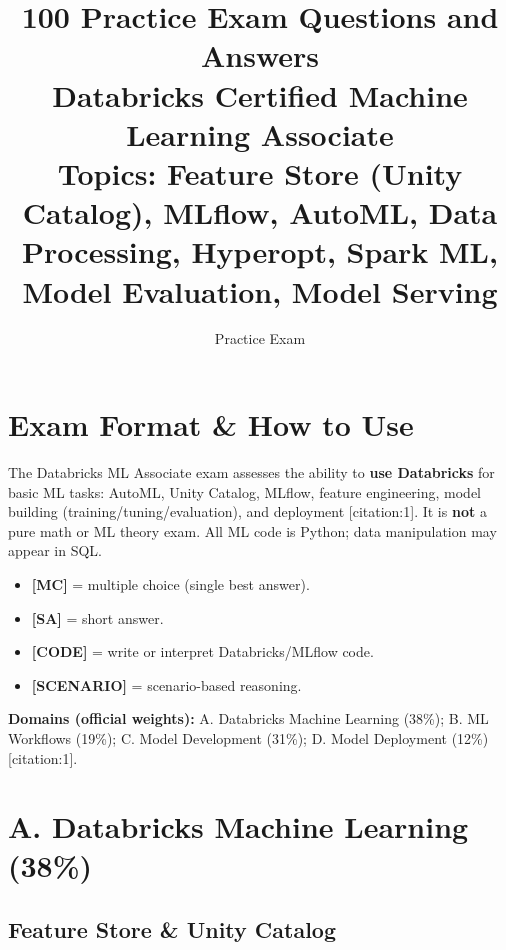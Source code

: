 \documentclass[11pt]{article}
\title{\textbf{100 Practice Exam Questions and Answers}\\[4pt]
	\large Databricks Certified \textbf{Machine Learning Associate}\\[2pt]
	\normalsize Topics: Feature Store (Unity Catalog), MLflow, AutoML, Data Processing, Hyperopt, Spark ML, Model Evaluation, Model Serving}
\author{Practice Exam}
\date{}
\begin{document}
	\maketitle
	\tableofcontents
	\newpage
	
	\section*{Exam Format \& How to Use}
	The Databricks ML Associate exam assesses the ability to \textbf{use Databricks} for basic ML tasks: AutoML, Unity Catalog, MLflow, feature engineering, model building (training/tuning/evaluation), and deployment [citation:1]. It is \textbf{not} a pure math or ML theory exam. All ML code is Python; data manipulation may appear in SQL.
	
	\begin{itemize}
		\item \textbf{[MC]} = multiple choice (single best answer).
		\item \textbf{[SA]} = short answer.
		\item \textbf{[CODE]} = write or interpret Databricks/MLflow code.
		\item \textbf{[SCENARIO]} = scenario-based reasoning.
	\end{itemize}
	
	\textbf{Domains (official weights):} A. Databricks Machine Learning (38\%); B. ML Workflows (19\%); C. Model Development (31\%); D. Model Deployment (12\%) [citation:1].
	\newpage
	
	\section{A. Databricks Machine Learning (38\%)}
	
	\subsection*{Feature Store \& Unity Catalog}
	
\end{document}
